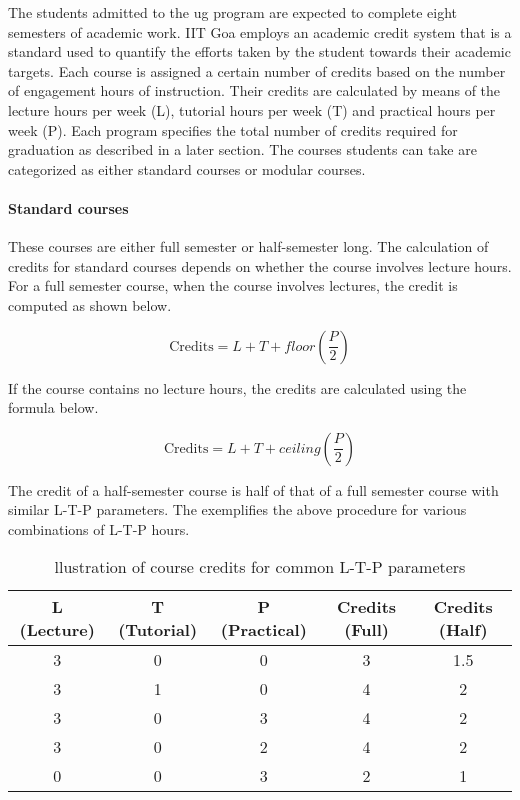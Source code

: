 The \glspl{student} admitted to the \acrshort{ug} program are expected to complete eight semesters of academic work. IIT Goa employs an academic credit system that is a standard used to quantify the efforts taken by the student towards their academic targets. Each course is assigned a certain number of credits based on the number of engagement hours of instruction. Their credits are calculated by means of the lecture hours per week (L), tutorial hours per week (T) and practical hours per week (P). Each program specifies the total number of credits required for graduation as described in a later section. The courses students can take are categorized as either standard courses or modular courses.

\paragraph{Standard courses} These courses are either full semester or half-semester long. The calculation of credits for standard courses depends on whether the course involves lecture hours. For a full semester course, when the course involves lectures, the credit is computed as shown below.

\begin{equation}
    \mathrm{Credits}=L+T+\mathit{floor}\left(\frac{P}{2}\right)
    \label{lab:CreditFloor}
\end{equation}

If the course contains no lecture hours, the credits are calculated using the formula below.

\begin{equation}
    \mathrm{Credits}=L+T+\mathit{ceiling}\left(\frac{P}{2}\right)
    \label{lab:CreditCeiling}
\end{equation}


The credit of a half-semester course is half of that of a full semester course with similar L-T-P parameters. The  exemplifies the above procedure for various combinations of L-T-P hours.

\begin{table}[t]
	
    \centering

    \begin{tabular}{c c c c c}
    	    \toprule
    \textbf{L (Lecture)} & \textbf{T (Tutorial)} & \textbf{P (Practical)} & \textbf{Credits (Full)} & \textbf{Credits (Half)}\\
    
\midrule
    
     3 & 0 & 0 & 3 & 1.5   \\
     3 & 1 & 0 & 4 & 2 \\
     3 & 0 & 3 & 4 & 2 \\
     3 & 0 & 2 & 4 & 2   \\
     0 & 0 & 3 & 2 & 1  \\
    \bottomrule
    \end{tabular}
    \caption{llustration of course credits for common L-T-P parameters}
    \label{tab:credits-example}
\end{table}


